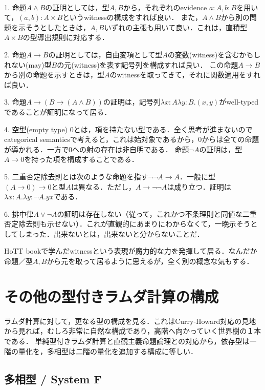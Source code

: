 \documentclass[uplatex, 12pt, dvipdfmx]{jsreport}
\begin{document}
\begin{example}[証明の表現]　

    1. 命題$A\land B$の証明としては，型$A,B$から，それぞれのevidence $a:A,b:B$を用いて，$(a,b):A\times B$というwitnessの構成をすれば良い．
    また，$A\land B$から別の問題を示そうとしたときは，$A,B$いずれの主張も用いて良い．これは，直積型$A\times B$の型導出規則に対応する．

    2. 命題$A\to B$の証明としては，自由変項として型$A$の変数(witness)を含むかもしれない(may)型$B$の元(witness)を表す記号列を構成すれば良い．
    この命題$A\to B$から別の命題を示すときは，型$A$のwitnessを取ってきて，それに関数適用をすれば良い．

    3. 命題$A\to (B\to (A\land B))$の証明は，記号列$\lambda x:A\lambda y:B.(x,y)$がwell-typedであることが証明になって居る．

    4. 空型(empty type) $0$とは，項を持たない型である．全く思考が進まないのでcategorical semanticsで考えると，これは始対象であるから，$0$からは全ての命題が導かれる．一方で$0$への射の存在は非自明である．
    命題$\lnot A$の証明は，型$A\to 0$を持った項を構成することである．

    5. 二重否定除去則とは次のような命題を指す$\lnot\lnot A\to A$．一般に型$(A\to 0)\to 0$と型$A$は異なる．ただし，$A\to\lnot\lnot A$は成り立つ．証明は$\lambda x:A.\lambda y:\lnot A.yx$である．

    6. 排中律$A\lor\lnot A$の証明は存在しない（従って，これかつ不条理則と同値な二重否定除去則も示せない）．これが直観的にあまりにわからなくて，一晩示そうとしてしまった．出来ないとは，出来ないと分からないことだ．
\end{example}
\begin{remark}
    HoTT bookで学んだwitnessという表現が魔力的な力を発揮して居る．なんだか命題／型$A,B$から元を取って居るように思えるが，全く別の概念な気もする．
\end{remark}

\section{その他の型付きラムダ計算の構成}
ラムダ計算に対して，更なる型の構成を見る．これはCurry-Howard対応の見地から見れば，むしろ非常に自然な構成であり，高階へ向かっていく世界樹の１本である．
単純型付きラムダ計算と直観主義命題論理との対応から，依存型は一階の量化を，多相型は二階の量化を追加する構成に等しい．

\subsection{多相型 / System F}
\end{document}
